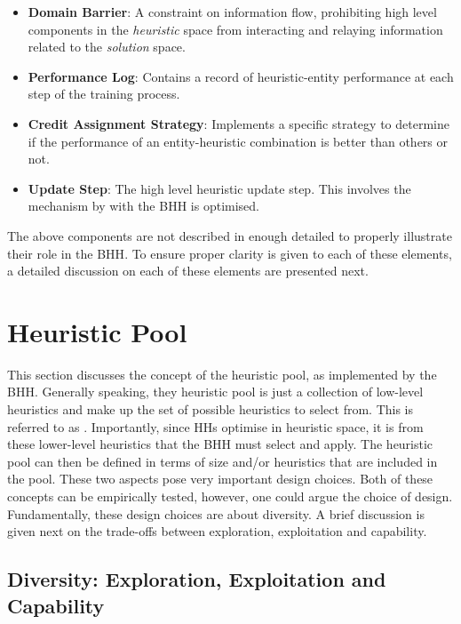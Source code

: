 \begin{itemize}
    \item \textbf{Domain Barrier}: A constraint on information flow, prohibiting high level components in the \textit{heuristic} space from interacting and relaying information related to the \textit{solution} space.
    
    \item \textbf{Performance Log}: Contains a record of heuristic-entity performance at each step of the training process.
    
    \item \textbf{Credit Assignment Strategy}: Implements a specific strategy to determine if the performance of an entity-heuristic combination is better than others or not.

    \item \textbf{Update Step}: The high level heuristic update step. This involves the mechanism by with the \ac{BHH} is optimised.
\end{itemize}

The above components are not described in enough detailed to properly illustrate their role in the \Ac{BHH}. To ensure proper clarity is given to each of these elements, a detailed discussion on each of these elements are presented next.


\section{Heuristic Pool}
\label{sec:bhh:heuristic_pool}

This section discusses the concept of the heuristic pool, as implemented by the \ac{BHH}. Generally speaking, they heuristic pool is just a collection of low-level heuristics and make up the set of possible heuristics to select from. This is referred to as . Importantly, since \acp{HH} optimise in heuristic space, it is from these lower-level heuristics that the \ac{BHH} must select and apply. The heuristic pool can then be defined in terms of size and/or heuristics that are included in the pool. These two aspects pose very important design choices. Both of these concepts can be empirically tested, however, one could argue the choice of design. Fundamentally, these design choices are about diversity. A brief discussion is given next on the trade-offs between exploration, exploitation and capability.

\subsection{Diversity: Exploration, Exploitation and Capability}
\label{sec:bhh:heuristic_pool:diversity}

